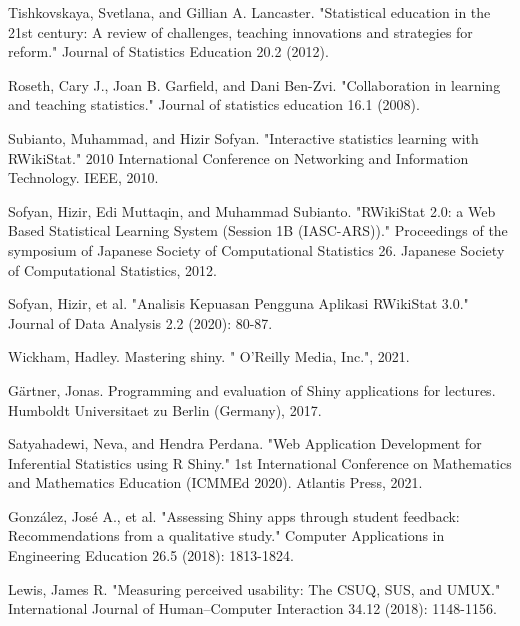 \documentclass[conference,a4paper]{IEEEtran}
\begin{document}
\begin{thebibliography}{00}
  Tishkovskaya, Svetlana, and Gillian A. Lancaster. "Statistical education in the 21st century: A review of challenges, teaching innovations and strategies for reform." Journal of Statistics Education 20.2 (2012).

  Roseth, Cary J., Joan B. Garfield, and Dani Ben-Zvi. "Collaboration in learning and teaching statistics." Journal of statistics education 16.1 (2008).

  Subianto, Muhammad, and Hizir Sofyan. "Interactive statistics learning with RWikiStat." 2010 International Conference on Networking and Information Technology. IEEE, 2010.

  Sofyan, Hizir, Edi Muttaqin, and Muhammad Subianto. "RWikiStat 2.0: a Web Based Statistical Learning System (Session 1B (IASC-ARS))." Proceedings of the symposium of Japanese Society of Computational Statistics 26. Japanese Society of Computational Statistics, 2012.

  Sofyan, Hizir, et al. "Analisis Kepuasan Pengguna Aplikasi RWikiStat 3.0." Journal of Data Analysis 2.2 (2020): 80-87.

  Wickham, Hadley. Mastering shiny. " O'Reilly Media, Inc.", 2021.

  Gärtner, Jonas. Programming and evaluation of Shiny applications for lectures. Humboldt Universitaet zu Berlin (Germany), 2017.

  Satyahadewi, Neva, and Hendra Perdana. "Web Application Development for Inferential Statistics using R Shiny." 1st International Conference on Mathematics and Mathematics Education (ICMMEd 2020). Atlantis Press, 2021.

  González, José A., et al. "Assessing Shiny apps through student feedback: Recommendations from a qualitative study." Computer Applications in Engineering Education 26.5 (2018): 1813-1824.

  Lewis, James R. "Measuring perceived usability: The CSUQ, SUS, and UMUX." International Journal of Human–Computer Interaction 34.12 (2018): 1148-1156.

\end{thebibliography}
\end{document}
